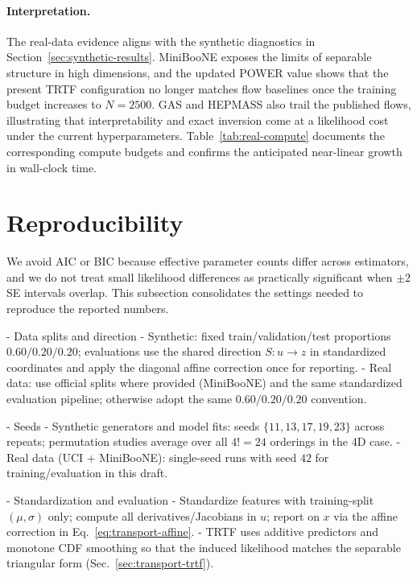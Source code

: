 \documentclass[11pt,a4paper,twoside]{book}\usepackage[]{graphicx}\usepackage[]{xcolor}
\begin{document}
\paragraph{Interpretation.} The real-data evidence aligns with the synthetic diagnostics in Section~\ref{sec:synthetic-results}. MiniBooNE exposes the limits of separable structure in high dimensions, and the updated POWER value shows that the present TRTF configuration no longer matches flow baselines once the training budget increases to $N=2500$. GAS and HEPMASS also trail the published flows, illustrating that interpretability and exact inversion come at a likelihood cost under the current hyperparameters. Table~\ref{tab:real-compute} documents the corresponding compute budgets and confirms the anticipated near-linear growth in wall-clock time.

\section{Reproducibility}\label{sec:reproducibility}
We avoid AIC or BIC because effective parameter counts differ across estimators, and we do not treat small likelihood differences as practically significant when $\pm 2$ SE intervals overlap. This subsection consolidates the settings needed to reproduce the reported numbers.

- Data splits and direction
  - Synthetic: fixed train/validation/test proportions $0.60/0.20/0.20$; evaluations use the shared direction $S:u\to z$ in standardized coordinates and apply the diagonal affine correction once for reporting.
  - Real data: use official splits where provided (MiniBooNE) and the same standardized evaluation pipeline; otherwise adopt the same $0.60/0.20/0.20$ convention.

- Seeds
  - Synthetic generators and model fits: seeds $\{11,13,17,19,23\}$ across repeats; permutation studies average over all $4!=24$ orderings in the 4D case.
  - Real data (UCI + MiniBooNE): single-seed runs with seed $42$ for training/evaluation in this draft.

- Standardization and evaluation
  - Standardize features with training-split $(\mu,\sigma)$ only; compute all derivatives/Jacobians in $u$; report on $x$ via the affine correction in Eq.~\eqref{eq:transport-affine}.
  - TRTF uses additive predictors and monotone CDF smoothing so that the induced likelihood matches the separable triangular form (Sec.~\ref{sec:transport-trtf}).
\end{document}

